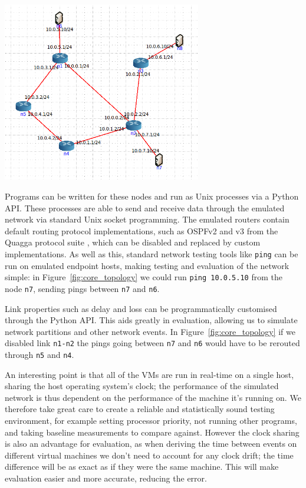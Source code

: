 \documentclass[withindex,glossary,openany]{cam-thesis}
\begin{document}
\begin{center}
\begin{minipage}{0.9\textwidth} \centering
	\includegraphics[width=0.65\textwidth]{core_topology}
	\label{fig:core_topology}
\end{minipage}
\end{center}

Programs can be written for these nodes and run as Unix processes via a Python API. These processes are able to send and receive data through the emulated network via standard Unix socket programming. The emulated routers contain default routing protocol implementations, such as OSPFv2 and v3 from the Quagga protocol suite \cite{QUAGGA}, which can be disabled and replaced by custom implementations. As well as this, standard network testing tools like \texttt{ping} can be run on emulated endpoint hosts, making testing and evaluation of the network simple: in Figure~\ref{fig:core_topology} we could run \texttt{ping 10.0.5.10} from the node \texttt{n7}, sending pings between \texttt{n7} and \texttt{n6}.

Link properties such as delay and loss can be programmatically customised through the Python API. This aids greatly in evaluation, allowing us to simulate network partitions and other network events. In Figure~\ref{fig:core_topology} if we disabled link \texttt{n1-n2} the pings going between \texttt{n7} and \texttt{n6} would have to be rerouted through \texttt{n5} and \texttt{n4}.

An interesting point is that all of the VMs are run in real-time on a single host, sharing the host operating system's clock; the performance of the simulated network is thus dependent on the performance of the machine it's running on. We therefore take great care to create a reliable and statistically sound testing environment, for example setting processor priority, not running other programs, and taking baseline measurements to compare against. However the clock sharing is also an advantage for evaluation, as when deriving the time between events on different virtual machines we don't need to account for any clock drift; the time difference will be as exact as if they were the same machine. This will make evaluation easier and more accurate, reducing the error.
\end{document}
